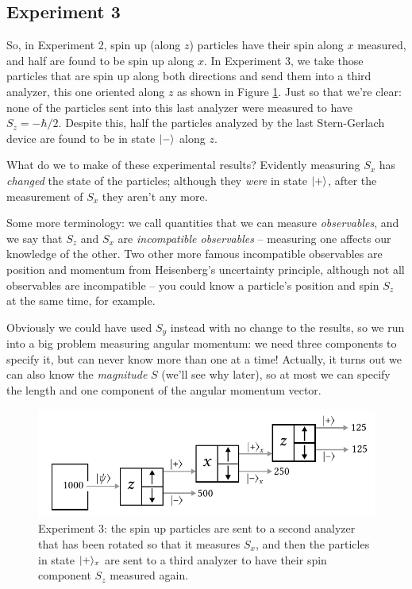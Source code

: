 \subsection{Experiment 3}

So, in Experiment 2, spin up (along $z$) particles have their spin along $x$ measured, and half are found to be spin up along $x$.  In Experiment 3, we take those particles that are spin up along both directions and send them into a third analyzer, this one oriented along $z$ as shown in Figure \ref{fig_sg_3}.  Just so that we're clear:  none of the particles sent into this last analyzer were measured to have $S_z = -\hbar/2$.  Despite this, half the particles analyzed by the last Stern-Gerlach device are found to be in state $| - \rangle$ along $z$.

What do we to make of these experimental results?  Evidently measuring $S_x$ has \emph{changed} the state of the particles; although they \emph{were} in state $| + \rangle$, after the measurement of $S_x$ they aren't any more.  

Some more terminology:  we call quantities that we can measure \emph{observables}, and we say that $S_z$ and $S_x$ are \emph{incompatible observables} -- measuring one affects our knowledge of the other.  Two other more famous incompatible observables are position and momentum from Heisenberg's uncertainty principle, although not all observables are incompatible -- you could know a particle's position and spin $S_z$ at the same time, for example.  

Obviously we could have used $S_y$ instead with no change to the results, so we run into a big problem measuring angular momentum:  we need three components to specify it, but can never know more than one at a time!  Actually, it turns out we can also know the \emph{magnitude} $S$ (we'll see why later), so at most we can specify the length and one component of the angular momentum vector.

\begin{figure}
\centering\includegraphics[width=\linewidth]{Figures/Chapter 1/fig_sg_3.pdf}
\caption{Experiment 3: the spin up particles are sent to a second analyzer that has been rotated so that it measures $S_x$, and then the particles in state $| + \rangle_x$ are sent to a third analyzer to have their spin component $S_z$ measured again. }
\label{fig_sg_3}
\end{figure}


